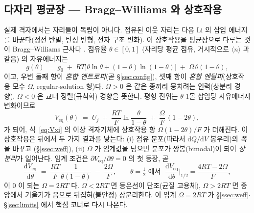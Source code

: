 \documentclass[11pt,a4paper]{article}
\newcommand{\dd}{\mathrm{d}}
\newcommand{\eq}{\mathrm{eq}}
\newcommand{\avg}[1]{\langle #1\rangle}
\begin{document}
\subsection{다자리 평균장 — Bragg--Williams 와 상호작용}\label{ssec:BW}
실제 격자에서는 자리들이 독립이 아니다. 점유된 이웃 자리는 다음 Li 의 삽입 에너지를 바꾼다(정전 반발,
탄성 변형, 전자 구조 변화). 이 상호작용을 평균장으로 다루는 것이 Bragg--Williams 근사다 \cite{huggins2009,
bazant2013}. 점유율 $\theta\in[0,1]$ (자리당 평균 점유, 거시적으로 $\avg{n}$ 과 같음) 의 자유에너지는
\begin{equation}
g(\theta) \;=\; g_0 \;+\; RT\bigl[\theta\ln\theta + (1-\theta)\ln(1-\theta)\bigr]
\;+\; \Omega\,\theta(1-\theta),
\label{eq:BW}
\end{equation}
이고, 우변 둘째 항이 \emph{혼합 엔트로피}(곧 \S\ref{sec:config}), 셋째 항이 \emph{혼합 엔탈피}(상호작용
모수 $\Omega$, regular-solution 형)다. $\Omega>0$ 은 같은 종끼리 뭉치려는 인력(상분리 경향), $\Omega<0$ 은
교대 정렬(규칙화) 경향을 뜻한다. 평형 전위는 $\theta$ 1몰 삽입당 자유에너지 변화이므로
\begin{equation}
V_\eq(\theta) \;=\; U_j \;+\; \frac{RT}{F}\ln\!\frac{\theta}{1-\theta} \;+\; \frac{\Omega}{F}\,(1-2\theta),
\label{eq:Veq_BW}
\end{equation}
가 되어, 식~\eqref{eq:Vxi} 의 이상 격자기체에 상호작용 항 $\Omega(1-2\theta)/F$ 가 더해진다. 이 상호작용은
뒤에서 두 가지 결과를 낳는다: (i) 점유 분포(따라서 $\dd Q/\dd V$ 봉우리)의 \emph{폭}을 바꾸고
(\S\ref{ssec:weff}), (ii) $\Omega$ 가 임계값을 넘으면 분포가 쌍봉(bimodal)이 되어 \emph{상분리}가 일어난다.
임계 조건은 $\partial V_\eq/\partial\theta=0$ 의 첫 등장, 곧
\begin{equation}
\frac{\dd V_\eq}{\dd\theta} \;=\; \frac{RT}{F}\frac{1}{\theta(1-\theta)} \;-\; \frac{2\Omega}{F},
\qquad
\theta=\tfrac12\text{ 에서 }\;\frac{\dd V_\eq}{\dd\theta}\Big|_{1/2}=\frac{4RT-2\Omega}{F},
\label{eq:slope_BW}
\end{equation}
이 0 이 되는 $\Omega=2RT$ 다. $\Omega<2RT$ 면 등온선이 단조(균질 고용체), $\Omega>2RT$ 면 중앙에서
기울기가 음으로 뒤집혀(불안정) 상분리한다. 이 임계 $\Omega=2RT$ 가 \S\ref{ssec:weff}$\cdot$\S\ref{sec:limits}
에서 핵심 코너로 다시 나온다.

\end{document}

